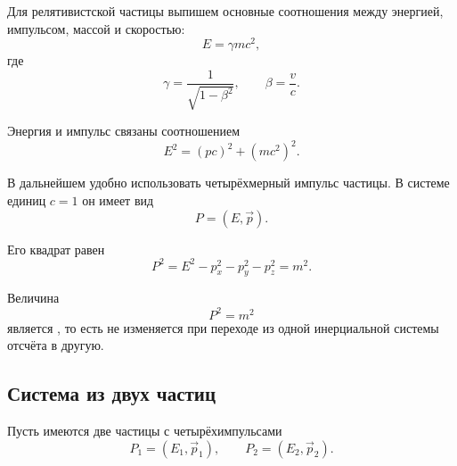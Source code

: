 \documentclass[../final.tex]{subfiles}
\begin{document}





Для релятивистской частицы выпишем основные соотношения между
энергией, импульсом, массой и скоростью:
%
\begin{equation*}
    E=\gamma mc^2,
\end{equation*}
%
где
%
\begin{equation*}
    \gamma
    =
    \frac{1}{\sqrt{1-\beta^2}},
    \qquad
    \beta
    =
    \frac{v}{c}.
\end{equation*}

Энергия и импульс связаны соотношением
%
\begin{equation*}
    E^2
    =
    (pc)^2+(mc^2)^2.
\end{equation*}

В дальнейшем удобно использовать четырёхмерный импульс частицы.
В системе единиц $c=1$ он имеет вид
%
\begin{equation*}
    P
    =
    (E,\vec p).
\end{equation*}

Его квадрат равен
%
\begin{equation*}
    P^2
    =
    E^2-p_x^2-p_y^2-p_z^2
    =
    m^2.
\end{equation*}

Величина
%
\begin{equation*}
    P^2=m^2
\end{equation*}
%
является , то есть не изменяется
при переходе из одной инерциальной системы отсчёта в другую.



\subsection*{Система из двух частиц}

Пусть имеются две частицы с четырёхимпульсами
%
\begin{equation*}
    P_1
    =
    (E_1,\vec p_1),
    \qquad
    P_2
    =
    (E_2,\vec p_2).
\end{equation*}
\end{document}

